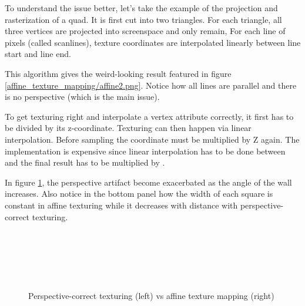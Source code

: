 To understand the issue better, let's take the example of the projection and rasterization of a quad. It is first cut into two triangles. For each triangle, all three vertices  are projected into screenspace and only  remain, For each line of pixels (called scanlines), texture coordinates are interpolated linearly between line start and line end.\\
\par
This algorithm gives the weird-looking result featured in figure \ref{affine_texture_mapping/affine2.png}. Notice how all lines are parallel and there is no perspective (which is the main issue).\\
\par
{}
\par
To get texturing right and interpolate a vertex attribute correctly, it first has to be divided by its z-coordinate. Texturing can then happen via linear interpolation. Before sampling the coordinate must be multiplied by Z again. The implementation is expensive since linear interpolation has to be done between  and the final result has to be multiplied by .\\
\par
In figure \ref{texture_anmgle}, the perspective artifact become exacerbated as the angle of the wall increases. Also notice in the bottom panel how the width of each square is constant in affine texturing while it decreases with distance with perspective-correct texturing.\\ 
\pagebreak




\par
\begin{figure}[H] \centering
\begin{minipage}{\textwidth}
 \hspace{2cm}
\\
\par

 \hspace{2cm}
\\
\par

 \hspace{2cm}
\\
\par
\end{minipage}
\caption{Perspective-correct texturing (left) vs affine texture mapping (right)}
\label{texture_anmgle}
\end{figure}
\par

